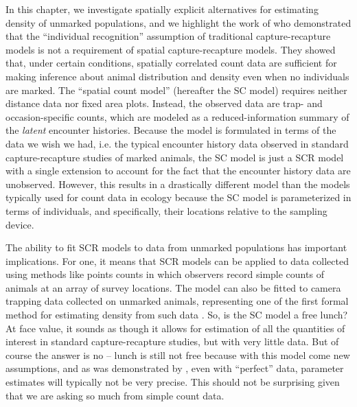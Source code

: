 In this chapter, we investigate spatially explicit alternatives for estimating density
of unmarked populations, and we highlight the work of
\citet{chandler_royle:2012} who demonstrated that the ``individual
recognition'' assumption of traditional capture-recapture models is not a
requirement of spatial capture-recapture models. They showed that,
under certain conditions, %
spatially correlated count
data are sufficient for making inference about animal distribution and
density even when no individuals are marked.
The \citet{chandler_royle:2012} ``spatial count model'' (hereafter the SC
model) requires neither distance data nor fixed area plots. Instead,
the observed data are trap- and occasion-specific counts, which
are modeled as a reduced-information summary of the \textit{latent}
encounter histories. Because the model is formulated in terms of the
data we wish we had, i.e. the typical encounter history data observed
in standard capture-recapture studies of marked animals, the SC model
is just a SCR model with a single extension to account for the fact
that the encounter history data are unobserved. However, this results
in a drastically different model than the models typically used for
count data in ecology because the SC model is parameterized in terms of
individuals, and specifically, their locations relative to the
sampling device.

The ability to fit SCR models to data from unmarked populations has
important implications. For one, it means that SCR models can
be applied to data collected using methods like points counts in which
observers record simple counts of animals at an array of survey
locations. The model can also be fitted to camera trapping data collected on
unmarked animals, representing one of the first formal method for estimating
density from such data \citep[but see][]{rowcliffe_etal:2008}.
So, is the SC model a free lunch? At face value, it sounds as though it
allows for estimation of
all the quantities of interest in standard
capture-recapture studies, but with very little
data. But of course the answer is no --
lunch is still not free because
with this model come new assumptions,
and as was demonstrated by
\citet{chandler_royle:2012}, even with ``perfect'' data, parameter estimates
will typically not be very precise. This should not be surprising
given that we are asking so much from simple count data.

